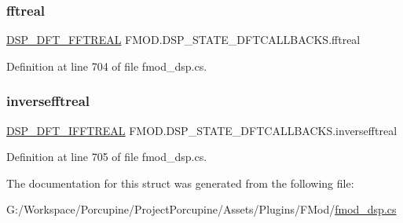 \subsubsection{\texorpdfstring{fftreal}{fftreal}}
{\footnotesize\ttfamily \hyperlink{namespace_f_m_o_d_aa012e977ef18d324c0c35f6b708c131d}{D\+S\+P\+\_\+\+D\+F\+T\+\_\+\+F\+F\+T\+R\+E\+AL} F\+M\+O\+D.\+D\+S\+P\+\_\+\+S\+T\+A\+T\+E\+\_\+\+D\+F\+T\+C\+A\+L\+L\+B\+A\+C\+K\+S.\+fftreal}



Definition at line 704 of file fmod\+\_\+dsp.\+cs.

\mbox{\label{struct_f_m_o_d_1_1_d_s_p___s_t_a_t_e___d_f_t_c_a_l_l_b_a_c_k_s_a314e0dc37bc287ee40c68747003d305f}} 
\subsubsection{\texorpdfstring{inversefftreal}{inversefftreal}}
{\footnotesize\ttfamily \hyperlink{namespace_f_m_o_d_acff7f43ee3fdbeba059b99619bb9f8f5}{D\+S\+P\+\_\+\+D\+F\+T\+\_\+\+I\+F\+F\+T\+R\+E\+AL} F\+M\+O\+D.\+D\+S\+P\+\_\+\+S\+T\+A\+T\+E\+\_\+\+D\+F\+T\+C\+A\+L\+L\+B\+A\+C\+K\+S.\+inversefftreal}



Definition at line 705 of file fmod\+\_\+dsp.\+cs.



The documentation for this struct was generated from the following file\+:\begin{DoxyCompactItemize}
\item 
G\+:/\+Workspace/\+Porcupine/\+Project\+Porcupine/\+Assets/\+Plugins/\+F\+Mod/\hyperlink{fmod__dsp_8cs}{fmod\+\_\+dsp.\+cs}\end{DoxyCompactItemize}
